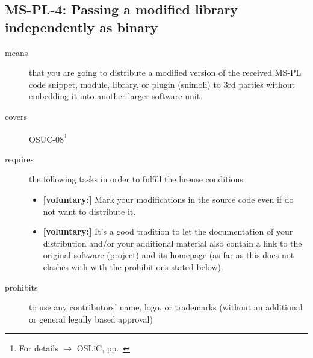 \subsection{MS-PL-4: Passing a modified library independently as binary}
\label{OSUC-08-MS-PL}
\begin{description}
\item[means] that you are going to distribute a modified version of the received
MS-PL code snippet, module, library, or plugin (snimoli) to 3rd parties without
embedding it into another larger software unit.
\item[covers] OSUC-08\footnote{For details $\rightarrow$ OSLiC, pp.\ \pageref{OSUC-08-DEF}}
\item[requires] the following tasks in order to fulfill the license conditions:

\begin{itemize}
  
  \item \textbf{[voluntary:]} Mark your modifications in the source code even if
  do not want to distribute it.
  
  \item \textbf{[voluntary:]} It's a good tradition to let the documentation of
  your distribution and/or your additional material also contain a link to the
  original software (project) and its homepage (as far as this does not clashes
  with with the prohibitions stated below).
    
\end{itemize}

\item[prohibits] to use any contributors' name, logo, or trademarks (without an
additional or general legally based approval)

\end{description}



